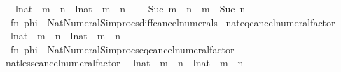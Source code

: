 \begin{isabellebody}
\ \ \ {\isachardoublequoteopen}{\isacharparenleft}{\kern0pt}l{\isacharcolon}{\kern0pt}{\isacharcolon}{\kern0pt}nat{\isacharparenright}{\kern0pt}\ {\isacharasterisk}{\kern0pt}\ m\ {\isacharminus}{\kern0pt}\ n{\isachardoublequoteclose}\ {\isacharbar}{\kern0pt}\ {\isachardoublequoteopen}{\isacharparenleft}{\kern0pt}l{\isacharcolon}{\kern0pt}{\isacharcolon}{\kern0pt}nat{\isacharparenright}{\kern0pt}\ {\isacharminus}{\kern0pt}\ m\ {\isacharasterisk}{\kern0pt}\ n{\isachardoublequoteclose}\ {\isacharbar}{\kern0pt}\isanewline
\ \ \ {\isachardoublequoteopen}Suc\ m\ {\isacharminus}{\kern0pt}\ n{\isachardoublequoteclose}\ {\isacharbar}{\kern0pt}\ {\isachardoublequoteopen}m\ {\isacharminus}{\kern0pt}\ Suc\ n{\isachardoublequoteclose}{\isacharparenright}{\kern0pt}\ {\isacharequal}{\kern0pt}\isanewline
\ \ {\isacartoucheopen}fn\ phi\ {\isacharequal}{\kern0pt}{\isachargreater}{\kern0pt}\ Nat{\isacharunderscore}{\kern0pt}Numeral{\isacharunderscore}{\kern0pt}Simprocs{\isachardot}{\kern0pt}diff{\isacharunderscore}{\kern0pt}cancel{\isacharunderscore}{\kern0pt}numerals{\isacartoucheclose}\isanewline
\isanewline
{}\isamarkupfalse%
\ nat{\isacharunderscore}{\kern0pt}eq{\isacharunderscore}{\kern0pt}cancel{\isacharunderscore}{\kern0pt}numeral{\isacharunderscore}{\kern0pt}factor\isanewline
\ \ {\isacharparenleft}{\kern0pt}{\isachardoublequoteopen}{\isacharparenleft}{\kern0pt}l{\isacharcolon}{\kern0pt}{\isacharcolon}{\kern0pt}nat{\isacharparenright}{\kern0pt}\ {\isacharasterisk}{\kern0pt}\ m\ {\isacharequal}{\kern0pt}\ n{\isachardoublequoteclose}\ {\isacharbar}{\kern0pt}\ {\isachardoublequoteopen}{\isacharparenleft}{\kern0pt}l{\isacharcolon}{\kern0pt}{\isacharcolon}{\kern0pt}nat{\isacharparenright}{\kern0pt}\ {\isacharequal}{\kern0pt}\ m\ {\isacharasterisk}{\kern0pt}\ n{\isachardoublequoteclose}{\isacharparenright}{\kern0pt}\ {\isacharequal}{\kern0pt}\isanewline
\ \ {\isacartoucheopen}fn\ phi\ {\isacharequal}{\kern0pt}{\isachargreater}{\kern0pt}\ Nat{\isacharunderscore}{\kern0pt}Numeral{\isacharunderscore}{\kern0pt}Simprocs{\isachardot}{\kern0pt}eq{\isacharunderscore}{\kern0pt}cancel{\isacharunderscore}{\kern0pt}numeral{\isacharunderscore}{\kern0pt}factor{\isacartoucheclose}\isanewline
\isanewline
{}\isamarkupfalse%
\ nat{\isacharunderscore}{\kern0pt}less{\isacharunderscore}{\kern0pt}cancel{\isacharunderscore}{\kern0pt}numeral{\isacharunderscore}{\kern0pt}factor\isanewline
\ \ {\isacharparenleft}{\kern0pt}{\isachardoublequoteopen}{\isacharparenleft}{\kern0pt}l{\isacharcolon}{\kern0pt}{\isacharcolon}{\kern0pt}nat{\isacharparenright}{\kern0pt}\ {\isacharasterisk}{\kern0pt}\ m\ {\isacharless}{\kern0pt}\ n{\isachardoublequoteclose}\ {\isacharbar}{\kern0pt}\ {\isachardoublequoteopen}{\isacharparenleft}{\kern0pt}l{\isacharcolon}{\kern0pt}{\isacharcolon}{\kern0pt}nat{\isacharparenright}{\kern0pt}\ {\isacharless}{\kern0pt}\ m\ {\isacharasterisk}{\kern0pt}\ n{\isachardoublequoteclose}{\isacharparenright}{\kern0pt}\ {\isacharequal}{\kern0pt}\isanewline

\end{isabellebody}
